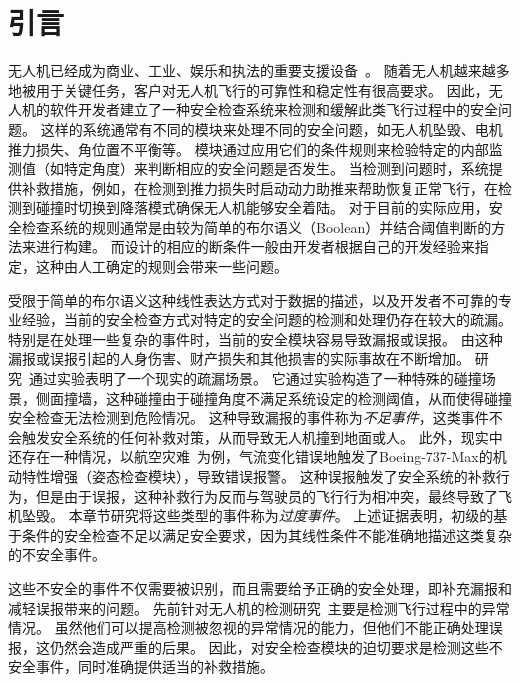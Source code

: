 \section{引言}
无人机已经成为商业、工业、娱乐和执法的重要支援设备~\cite{chabot2018trends,banos2020assessment,patino2009adaptive,shukla2016application,huang2021multi,li2018uav}。
随着无人机越来越多地被用于关键任务，客户对无人机飞行的可靠性和稳定性有很高要求。
因此，无人机的软件开发者建立了一种安全检查系统来检测和缓解此类飞行过程中的安全问题。
这样的系统通常有不同的模块来处理不同的安全问题，如无人机坠毁、电机推力损失、角位置不平衡等。
模块通过应用它们的条件规则来检验特定的内部监测值（如特定角度）来判断相应的安全问题是否发生。
当检测到问题时，系统提供补救措施，例如，在检测到推力损失时启动动力助推来帮助恢复正常飞行，在检测到碰撞时切换到降落模式确保无人机能够安全着陆。
对于目前的实际应用，安全检查系统的规则通常是由较为简单的布尔语义（Boolean）并结合阈值判断的方法来进行构建。
而设计的相应的断条件一般由开发者根据自己的开发经验来指定，这种由人工确定的规则会带来一些问题。


受限于简单的布尔语义这种线性表达方式对于数据的描述，以及开发者不可靠的专业经验，当前的安全检查方式对特定的安全问题的检测和处理仍存在较大的疏漏。
特别是在处理一些复杂的事件时，当前的安全模块容易导致漏报或误报。
由这种漏报或误报引起的人身伤害、财产损失和其他损害的实际事故在不断增加。
研究~\cite{choi2020cyber}通过实验表明了一个现实的疏漏场景。
它通过实验构造了一种特殊的碰撞场景，侧面撞墙，这种碰撞由于碰撞角度不满足系统设定的检测阈值，从而使得碰撞安全检查无法检测到危险情况。
这种导致漏报的事件称为\emph{不足事件}，这类事件不会触发安全系统的任何补救对策，从而导致无人机撞到地面或人。
此外，现实中还存在一种情况，以航空灾难~\cite{boe18,boe19}为例，气流变化错误地触发了Boeing-737-Max的机动特性增强（姿态检查模块），导致错误报警。
这种误报触发了安全系统的补救行为，但是由于误报，这种补救行为反而与驾驶员的飞行行为相冲突，最终导致了飞机坠毁。
本章节研究将这些类型的事件称为\emph{过度事件}。
上述证据表明，初级的基于条件的安全检查不足以满足安全要求，因为其线性条件不能准确地描述这类复杂的不安全事件。

这些不安全的事件不仅需要被识别，而且需要给予正确的安全处理，即补充漏报和减轻误报带来的问题。
先前针对无人机的检测研究~\cite{choi2018detecting, fei2018cross, piper, choi2020software, ahn2019learning}主要是检测飞行过程中的异常情况。
虽然他们可以提高检测被忽视的异常情况的能力，但他们不能正确处理误报，这仍然会造成严重的后果。
因此，对安全检查模块的迫切要求是检测这些不安全事件，同时准确提供适当的补救措施。

